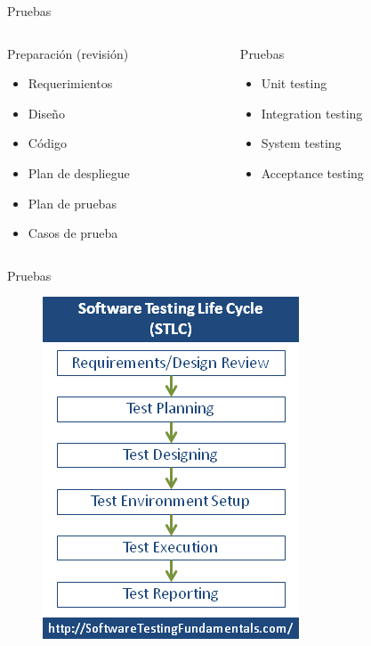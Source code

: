 \documentclass[aspectratio=169]{beamer}
\begin{document}
\begin{frame}{Pruebas}
\begin{columns}[T]
	\begin{column}[T]{5cm}
		Preparación (revisión)
		\begin{itemize}
			\item Requerimientos
			\item Diseño
			\item Código
			\item Plan de despliegue
			\item Plan de pruebas
			\item Casos de prueba
		\end{itemize}
	\end{column}
	\begin{column}[T]{5cm} %
		Pruebas
		\begin{itemize}
			\item Unit testing
			\item Integration testing
			\item System testing
			\item Acceptance testing
		\end{itemize}
	\end{column}
\end{columns}
\end{frame}

\begin{frame}{Pruebas}
\begin{figure}
	\centering
	\includegraphics[width=0.4\linewidth]{Images/lifecycle}
\end{figure}
\end{frame}
\end{document}
